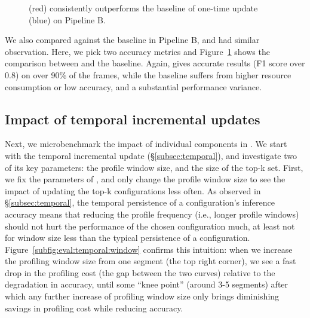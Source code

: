 \begin{figure}[t!]
    \centering
    \hspace{-0.5cm}
    \caption{\name (red) consistently outperforms the baseline of one-time update (blue) on Pipeline B.}
    \label{fig:eval:e2e-b}
\end{figure}

We also compared \name against the baseline in Pipeline B, and had similar observation. Here, we pick two accuracy metrics and Figure~\ref{fig:eval:e2e-b} shows the comparison between \name and the baseline. Again, \name gives accurate results (F1 score over 0.8) on over 90\% of the frames, while the baseline suffers from higher resource consumption or low accuracy, and a substantial performance variance.



\subsection{Impact of temporal incremental updates}
\label{sec:eval:temporal}
Next, we microbenchmark the impact of individual components in \name. 
We start with the temporal incremental update (\S\ref{subsec:temporal}), and investigate two of its key parameters: the profile window size, and the size of the top-k set.
First, we fix the parameters of \name, and only change the profile window size to see the impact of updating the top-k configurations less often. As observed in \S\ref{subsec:temporal}, the temporal persistence of a configuration's inference accuracy means that reducing the profile frequency (i.e., longer profile windows) should not hurt the performance of the chosen configuration much, at least not for window size less than the typical persistence of a configuration. 
Figure~\ref{subfig:eval:temporal:window} confirms this intuition: 
when we increase the profiling window size from one segment (the top right corner), we see a fast drop in the profiling cost (the gap between the two curves) relative to the degradation in accuracy, until some ``knee point'' (around 3-5 segments) after which any further increase of profiling window size only brings diminishing savings in profiling cost while  reducing accuracy.

